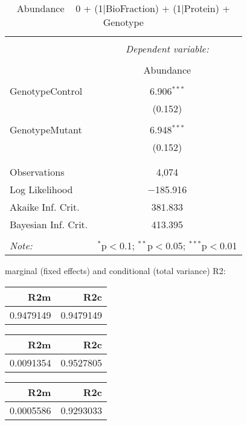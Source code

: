 \documentclass[11pt]{report}
\begin{document}
\begin{table}[!htbp] \centering 
  \caption{Abundance ~ 0 + (1|BioFraction) + (1|Protein) + Genotype} 
  \label{} 
\begin{tabular}{@{\extracolsep{5pt}}lc} 
\\[-1.8ex]\hline 
\hline \\[-1.8ex] 
 & \multicolumn{1}{c}{\textit{Dependent variable:}} \\ 
\cline{2-2} 
\\[-1.8ex] & Abundance \\ 
\hline \\[-1.8ex] 
 GenotypeControl & 6.906$^{***}$ \\ 
  & (0.152) \\ 
  & \\ 
 GenotypeMutant & 6.948$^{***}$ \\ 
  & (0.152) \\ 
  & \\ 
\hline \\[-1.8ex] 
Observations & 4,074 \\ 
Log Likelihood & $-$185.916 \\ 
Akaike Inf. Crit. & 381.833 \\ 
Bayesian Inf. Crit. & 413.395 \\ 
\hline 
\hline \\[-1.8ex] 
\textit{Note:}  & \multicolumn{1}{r}{$^{*}$p$<$0.1; $^{**}$p$<$0.05; $^{***}$p$<$0.01} \\ 
\end{tabular} 
\end{table} 
marginal (fixed effects) and conditional (total variance) R2:

\begin{tabular}{r|r}
\hline
R2m & R2c\\
\hline
0.9479149 & 0.9479149\\
\hline
\end{tabular}

\begin{tabular}{r|r}
\hline
R2m & R2c\\
\hline
0.0091354 & 0.9527805\\
\hline
\end{tabular}

\begin{tabular}{r|r}
\hline
R2m & R2c\\
\hline
0.0005586 & 0.9293033\\
\hline
\end{tabular}
\end{document}
